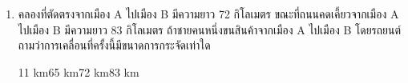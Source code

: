 \begin{enumerate}
	\item  \runningj \nonet  คลองที่ตัดตรงจากเมือง  A  ไปเมือง  B  มีความยาว  72  กิโลเมตร  ขณะที่ถนนคดเคี้ยวจากเมือง  A  ไปเมือง  B  มีความยาว  83  กิโลเมตร  ถ้าชายคนหนึ่งขนสินค้าจากเมือง  A  ไปเมือง  B  โดยรถยนต์  ถามว่าการเคลื่อนที่ครั้งนี้มีขนาดการกระจัดเท่าใด 
	\begin{4c}
		{11 km}{65 km}{72 km}{83 km}
	\end{4c}
\end{enumerate}
